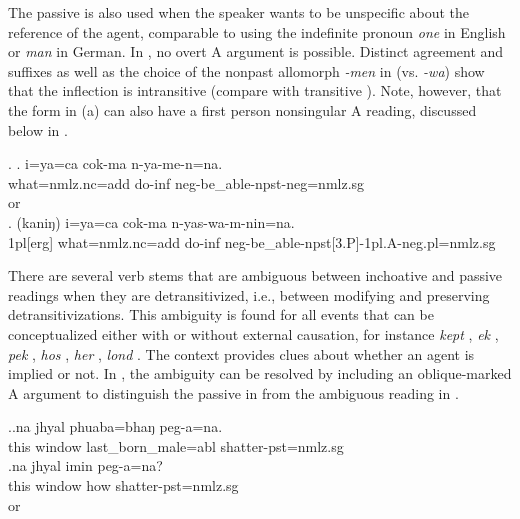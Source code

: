 The passive is also used when the speaker wants to be unspecific about the reference of the agent, comparable to using the indefinite pronoun \emph{one} in English or \emph{man} in German. In  \Next[a], no overt A argument is possible. Distinct agreement and  suffixes as well as the choice of the nonpast allomorph \emph{-men} in \Next[a] (vs.  \emph{-wa}) show that the inflection is intransitive (compare with transitive \Next[b]). Note, however, that the form in (a) can also have a first person nonsingular A reading, discussed below in .

\largerpage 
\ex. \ag. i=ya=ca cok-ma n-ya-me-n=na.\\
what{\sc =nmlz.nc=add} do{\sc -inf} {\sc neg-}be\_able{\sc [3sg]-npst-neg=nmlz.sg}\\
 or\\
\bg. (kaniŋ) i=ya=ca cok-ma n-yas-wa-m-nin=na.\\
{\sc 1pl[erg]} what{\sc =nmlz.nc=add} do{\sc -inf} {\sc neg-}be\_able{\sc -npst[3.P]-1pl.A-neg.pl=nmlz.sg}\\ 


There are several verb stems that are ambiguous between inchoative and passive readings when they are detransitivized, i.e., between  modifying and  preserving detransitivizations. This ambiguity is found for all events that can be conceptualized either with or without external causation, for instance \emph{kept} , \emph{ek} ,  \emph{pek} , \emph{hos} , \emph{her} , \emph{lond} . The context provides clues about whether an agent is implied or not. In \Next, the ambiguity can be resolved by including an oblique-marked A argument to distinguish the passive in \Next[a] from the ambiguous reading in \Next[b]. 

\ex.\ag.na jhyal phuaba=bhaŋ peg-a=na.\\
this window  last\_born\_male{\sc =abl}  shatter{\sc [3sg]-pst=nmlz.sg}\\
\bg.na jhyal imin peg-a=na?\\
this window how shatter{\sc [3sg]-pst=nmlz.sg}\\
 or \\

